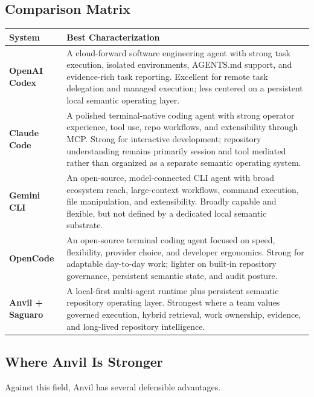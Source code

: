 \documentclass[11pt,a4paper]{article}
\begin{document}
\subsection{Comparison Matrix}
\renewcommand{\arraystretch}{1.18}
\begin{tabularx}{\textwidth}{>{\raggedright\arraybackslash}p{} >{\raggedright\arraybackslash}X}
\toprule
\textbf{System} & \textbf{Best Characterization} \\
\midrule
\textbf{OpenAI Codex} & A cloud-forward software engineering agent with strong task execution, isolated environments, AGENTS.md support, and evidence-rich task reporting. Excellent for remote task delegation and managed execution; less centered on a persistent local semantic operating layer.\cite{openai_codex_intro,openai_codex_docs} \\
\textbf{Claude Code} & A polished terminal-native coding agent with strong operator experience, tool use, repo workflows, and extensibility through MCP. Strong for interactive development; repository understanding remains primarily session and tool mediated rather than organized as a separate semantic operating system.\cite{anthropic_claude_code} \\
\textbf{Gemini CLI} & An open-source, model-connected CLI agent with broad ecosystem reach, large-context workflows, command execution, file manipulation, and extensibility. Broadly capable and flexible, but not defined by a dedicated local semantic substrate.\cite{google_gemini_cli} \\
\textbf{OpenCode} & An open-source terminal coding agent focused on speed, flexibility, provider choice, and developer ergonomics. Strong for adaptable day-to-day work; lighter on built-in repository governance, persistent semantic state, and audit posture.\cite{opencode_docs} \\
\textbf{Anvil + Saguaro} & A local-first multi-agent runtime plus persistent semantic repository operating layer. Strongest where a team values governed execution, hybrid retrieval, work ownership, evidence, and long-lived repository intelligence. \\
\bottomrule
\end{tabularx}

\subsection{Where Anvil Is Stronger}
Against this field, Anvil has several defensible advantages.
\end{document}
